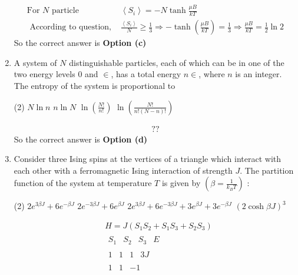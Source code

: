\begin{enumerate}
\begin{answer}
\begin{align*}
	\text{For $N$ particle }&\left\langle S_{i}\right\rangle=-N \tanh \frac{\mu B}{k T}\\
\text{	According to question, }&\frac{\left\langle S_{i}\right\rangle}{N} \geq \frac{1}{3} \Rightarrow-\tanh \left(\frac{\mu B}{k T}\right)=\frac{1}{3} \Rightarrow \frac{\mu B}{k T}=\frac{1}{2} \ln 2
	\end{align*}
		So the correct answer is \textbf{Option (c)}
\end{answer}
	\item A system of $N$ distinguishable particles, each of which can be in one of the two energy levels 0 and $\in$, has a total energy $n \in$, where $n$ is an integer. The entropy of the system is proportional to
	 \begin{tasks}(2)
		\task[\textbf{a.}]$N \ln n$
		\task[\textbf{b.}]$n \ln N$
		\task[\textbf{c.}] $\ln \left(\frac{N !}{n !}\right)$
		\task[\textbf{d.}] $\ln \left(\frac{N !}{n !(N-n) !}\right)$
	\end{tasks}
\begin{answer}
	\begin{align*}
	??
	\end{align*}
	So the correct answer is \textbf{Option (d)}
\end{answer}
\item Consider three Ising spins at the vertices of a triangle which interact with each other with a ferromagnetic Ising interaction of strength $J$. The partition function of the system at temperature $T$ is given by $\left(\beta=\frac{1}{k_{B} T}\right)$ :
 \begin{tasks}(2)
	\task[\textbf{a.}] $2 e^{3 \beta J}+6 e^{-\beta J}$
	\task[\textbf{b.}] $2 e^{-3 \beta J}+6 e^{\beta J}$
	\task[\textbf{c.}]$2 e^{3 \beta J}+6 e^{-3 \beta J}+3 e^{\beta J}+3 e^{-\beta J}$
	\task[\textbf{d.}] $(2 \cosh \beta J)^{3}$
\end{tasks}
\begin{answer}
	\begin{align*}
	&H=J\left(S_{1} S_{2}+S_{1} S_{3}+S_{2} S_{3}\right)\\
	&\begin{array}{llll}
	S_{1} & S_{2} & S_{3} & E
	\end{array}\\
	&\begin{array}{llll}
	1 & 1 & 1 & 3 J
	\end{array}\\
	&\left.\begin{array}{ccc}
	1 & 1 & -1 \\

\end{array}
\end{align*}
\end{answer}
\end{enumerate}
